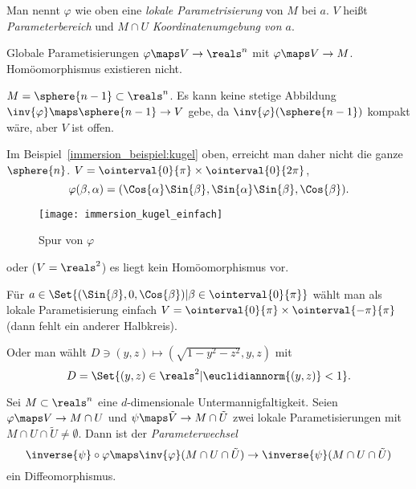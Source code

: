 \begin{bemerkungen*}
  \item Man nennt \( \varphi \) wie oben eine \emph{lokale Parametrisierung} von \( M \) bei \( a \). \( V \) heißt \emph{Parameterbereich} und \( M\cap U \) \emph{Koordinatenumgebung von \( a \)}.
  \item Globale Parametisierungen \( \varphi\maps V\to\reals^n \) mit \( \varphi\maps V\to M \). Homöomorphismus existieren \ia nicht.
  \begin{beispiel*}
    \( M=\sphere{n-1}\subset \reals^n \). Es kann keine stetige Abbildung \( \inv{\varphi}\maps \sphere{n-1}\to V \) gebe, da \( \inv{\varphi}(\sphere{n-1}) \) kompakt wäre, aber \( V \) ist offen.
    
    Im Beispiel~\ref{immersion_beispiel:kugel} oben, erreicht man daher nicht die ganze \( \sphere{n} \). \( V=\ointerval{0}{\pi}\times \ointerval{0}{2\pi} \),
    \begin{equation*}
      \varphi(\beta,\alpha)=(\Cos{\alpha}\Sin{\beta},\Sin{\alpha}\Sin{\beta},\Cos{\beta}).
    \end{equation*}
    \begin{figure}[H]
      \centering
      \texttt{[image: immersion\_kugel\_einfach]}
      \caption*{Spur von \( \varphi \)}
      \label{fig:immersion_kugel_einfach}
    \end{figure}
    oder (\( V=\reals^2 \)) es liegt kein Homöomorphismus vor.

    Für \( a\in \Set{(\Sin{\beta},0,\Cos{\beta})|\beta\in \ointerval{0}{\pi}} \) wählt man als lokale Parametisierung einfach \( V=\ointerval{0}{\pi}\times \ointerval{-\pi}{\pi} \) (dann fehlt ein anderer Halbkreis).

    Oder man wählt \( D\ni (y,z)\mapsto (\sqrt{1-y^2-z^2},y,z) \) mit
    \begin{equation*}
      D=\Set{(y,z)\in \reals^2|\euclidiannorm{(y,z)}<1}.
    \end{equation*}
  \end{beispiel*}
\end{bemerkungen*}
\begin{satz}[Parameterwechsel]\label{parameterwechsel}
  Sei \( M\subset \reals^n \) eine \( d \)-dimensionale Untermannigfaltigkeit. Seien \( \varphi\maps V\to M\cap U \) und \( \psi\maps \tilde{V}\to M\cap \tilde{U} \) zwei lokale Parametisierungen mit \( M\cap U\cap \tilde{U}\neq \emptyset \). Dann ist der \emph{Parameterwechsel}   
  \begin{equation*}
    \inverse{\psi}\circ \varphi\maps \inv{\varphi}(M\cap U\cap \tilde{U})\to \inverse{\psi}(M\cap U\cap \tilde{U})
  \end{equation*}
  ein Diffeomorphismus.
\end{satz}
